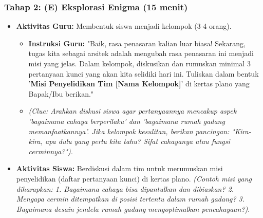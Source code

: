 \documentclass[12pt,a4paper]{article}
\begin{document}
\subsubsection{Tahap 2: (E) Eksplorasi Enigma (15 menit)}
\begin{itemize}
\item \textbf{Aktivitas Guru:} Membentuk siswa menjadi kelompok (3-4 orang).
    \begin{itemize}
    \item \textbf{Instruksi Guru:} "Baik, rasa penasaran kalian luar biasa! Sekarang, tugas kita sebagai arsitek adalah mengubah rasa penasaran ini menjadi misi yang jelas. Dalam kelompok, diskusikan dan rumuskan minimal 3 pertanyaan kunci yang akan kita selidiki hari ini. Tuliskan dalam bentuk '\textbf{Misi Penyelidikan Tim [Nama Kelompok]}' di kertas plano yang Bapak/Ibu berikan."
    \item \textit{(Clue: Arahkan diskusi siswa agar pertanyaannya mencakup aspek 'bagaimana cahaya berperilaku' dan 'bagaimana rumah gadang memanfaatkannya'. Jika kelompok kesulitan, berikan pancingan: "Kira-kira, apa dulu yang perlu kita tahu? Sifat cahayanya atau fungsi cerminnya?").}
    \end{itemize}
\item \textbf{Aktivitas Siswa:} Berdiskusi dalam tim untuk merumuskan misi penyelidikan (daftar pertanyaan kunci) di kertas plano. \textit{(Contoh misi yang diharapkan: 1. Bagaimana cahaya bisa dipantulkan dan dibiaskan? 2. Mengapa cermin ditempatkan di posisi tertentu dalam rumah gadang? 3. Bagaimana desain jendela rumah gadang mengoptimalkan pencahayaan?)}.
\end{itemize}
\end{document}
